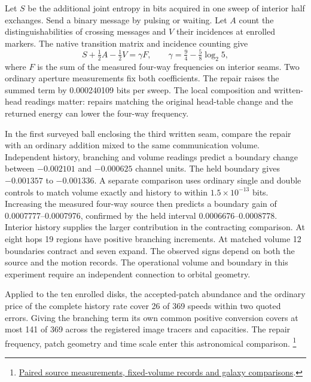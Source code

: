 \documentclass[11pt]{article}
\begin{document}
Let $S$ be the additional joint entropy in bits acquired in one sweep
of interior half exchanges. Send a binary message by pulsing or
waiting. Let $A$ count the distinguishabilities of crossing messages
and $V$ their incidences at enrolled markers. The native transition
matrix and incidence counting give
\[
 S+\tfrac12 A-\tfrac12 V=\gamma F,\qquad
 \gamma=\tfrac94-\tfrac58\log_2 5 ,
\]
where $F$ is the sum of the measured four-way frequencies on interior
seams. Two ordinary aperture measurements fix both coefficients.
The repair raises the summed term by 0.000240109 bits per sweep.
The local composition and written-head readings matter: repairs
matching the original head-table change and the returned energy
can lower the four-way frequency.

In the first surveyed ball enclosing the third written seam, compare
the repair with an ordinary addition mixed to the same communication
volume. Independent history, branching and volume readings predict
a boundary change between $-0.002101$ and $-0.000625$ channel units.
The held boundary gives $-0.001357$ to $-0.001336$. A separate
comparison uses ordinary single and double controls to match volume
exactly and history to within $1.5\times10^{-13}$ bits. Increasing the
measured four-way source then predicts a boundary gain of
0.0007777--0.0007976, confirmed by the held interval
0.0006676--0.0008778. Interior history supplies the larger contribution
in the contracting comparison. At eight hops
19 regions have positive branching increments. At matched volume
12 boundaries contract and seven expand. The observed signs depend
on both the source and the motion records. The operational volume
and boundary in this experiment require an independent connection
to orbital geometry.

Applied to the ten enrolled disks, the accepted-patch abundance and
the ordinary price of the complete history rate cover 26 of 369 speeds
within two quoted errors. Giving the branching term its own common
positive conversion covers at most 141 of 369 across the registered
image tracers and capacities. The repair frequency, patch geometry
and time scale enter this astronomical comparison.%
\footnote{\href{https://github.com/FloatingPragma/observer-patch-holography/blob/main/model/experiments/interval_echo_shell_flux/product_address/green_response/material_recoil/overlap_source/native_boundary/stock/aperture/MOVING_RESULTS.md}{Paired source measurements, fixed-volume records and galaxy comparisons}.}
\end{document}
